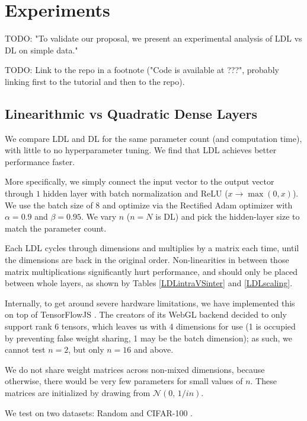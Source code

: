 \documentclass{article}
\begin{document}
\section{Experiments}

    TODO: "To validate our proposal, we present an experimental analysis of LDL vs DL on simple data."

    TODO: Link to the repo in a footnote ("Code is available at ???", probably linking first to the tutorial and then to the repo).

\subsection{Linearithmic vs Quadratic Dense Layers}

We compare LDL and DL for the same parameter count (and computation time), with little to no hyperparameter tuning. We find that LDL achieves better performance faster.

More specifically, we simply connect the input vector to the output vector through $1$ hidden layer with batch normalization \cite{ioffe2015batch} and ReLU ($x \rightarrow \max(0,x)$). We use the batch size of $8$ and optimize via the Rectified Adam optimizer \cite{liu2019radam} with $\alpha=0.9$ and $\beta=0.95$. We vary $n$ ($n=N$ is DL) and pick the hidden-layer size to match the parameter count.

Each LDL cycles through dimensions and multiplies by a matrix each time, until the dimensions are back in the original order. Non-linearities in between those matrix multiplications significantly hurt performance, and should only be placed between whole layers, as shown by Tables \ref{LDLintraVSinter} and \ref{LDLscaling}.

Internally, to get around severe hardware limitations, we have implemented this on top of TensorFlowJS \cite{tensorflow2015-whitepaper}. The creators of its WebGL backend decided to only support rank $6$ tensors, which leaves us with 4 dimensions for use (1 is occupied by preventing false weight sharing, 1 may be the batch dimension); as such, we cannot test $n=2$, but only $n=16$ and above.

We do not share weight matrices across non-mixed dimensions, because otherwise, there would be very few parameters for small values of $n$. These matrices are initialized by drawing from $\mathcal{N}(0,\,1/in)$.

We test on two datasets: Random and CIFAR-100 \cite{Krizhevsky09learningmultiple}.
\end{document}
